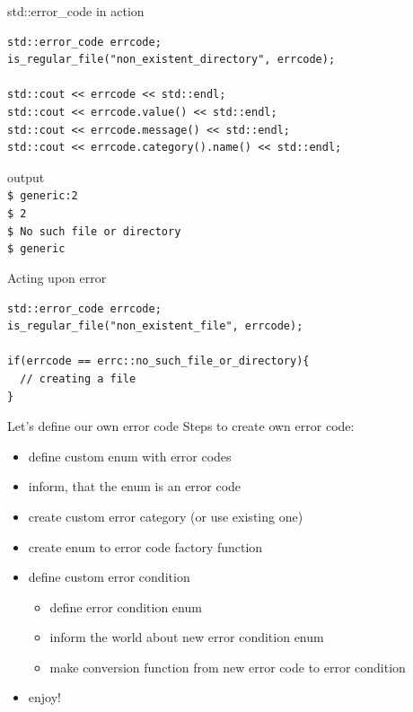 \documentclass[10pt]{beamer}
\begin{document}
\begin{frame}[fragile]{std::error\_code in action}
	\begin{verbatim}
std::error_code errcode;
is_regular_file("non_existent_directory", errcode);

std::cout << errcode << std::endl;
std::cout << errcode.value() << std::endl;
std::cout << errcode.message() << std::endl;
std::cout << errcode.category().name() << std::endl;
	\end{verbatim}
	
	\hrulefill
	
	\begin{block}{output}
	\texttt{\\
		\$ generic:2 \\
		\$ 2 \\
		\$ No such file or directory \\
		\$ generic}	
	\end{block}
	
\end{frame}

\begin{frame}[fragile]{Acting upon error}
	\begin{verbatim}
std::error_code errcode;
is_regular_file("non_existent_file", errcode);
  
if(errcode == errc::no_such_file_or_directory){
  // creating a file
}
	\end{verbatim}
\end{frame}

\begin{frame}{Let's define our own error code}
	Steps to create own error code:
	\begin{itemize}[<+- | alert@+>]
		\item define custom enum with error codes
		\item inform, that the enum is an error code
		\item create custom error category (or use existing one)
		\item create enum to error code factory function
		\item define custom error condition
		\begin{itemize}
			\item define error condition enum
			\item inform the world about new error condition enum
			\item make conversion function from new error code to error condition
		\end{itemize}
		\item enjoy!
	\end{itemize}
\end{frame}
\end{document}
